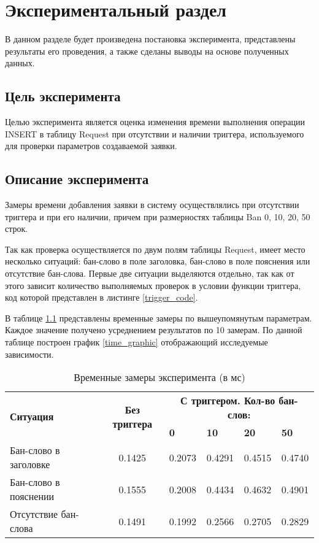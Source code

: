 \chapter{Экспериментальный раздел}

В данном разделе будет произведена постановка эксперимента, представлены результаты его проведения, а также сделаны выводы на основе полученных данных.

\section{Цель эксперимента}

Целью эксперимента является оценка изменения времени выполнения операции INSERT в таблицу Request при отсутствии и наличии триггера, используемого для проверки параметров создаваемой заявки.

\section{Описание эксперимента}

Замеры времени добавления заявки в систему осуществлялись при отсутствии триггера и при его наличии, причем при размерностях таблицы Ban 0, 10, 20, 50 строк.

Так как проверка осуществляется по двум полям таблицы Request, имеет место несколько ситуаций: бан-слово в поле заголовка, бан-слово в поле пояснения или отсутствие бан-слова. Первые две ситуации выделяются отдельно, так как от этого зависит количество выполняемых проверок в условии функции триггера, код которой представлен в листинге \ref{trigger_code}.
\newpage

В таблице \ref{time_measurements} представлены временные замеры по вышеупомянутым параметрам. Каждое значение получено усреднением результатов по 10 замерам. По данной таблице построен график \ref{time_graphic} отображающий исследуемые зависимости.

\begin{table}[H]
	\centering
	\caption{Временные замеры эксперимента (в мс)}
	\label{time_measurements}
	\begin{tabular}{|p{2.6cm}|c|p{1.6cm}|p{1.6cm}|p{1.6cm}|p{1.6cm}|}
		\hline
		\multirow{2}{*}{\textbf{Ситуация}} & \multirow{2}{*}{\textbf{Без триггера}} & \multicolumn{4}{c|}{\textbf{С триггером. Кол-во бан-слов:}}\\
		\cline{3-6}
		& & \textbf{0} & \textbf{10} & \textbf{20} & \textbf{50}\\
		\hline
		Бан-слово в заголовке & 0.1425 & 0.2073 & 0.4291 & 0.4515 & 0.4740 \\
		\hline
		Бан-слово в пояснении & 0.1555 & 0.2008 & 0.4434 & 0.4632 & 0.4901 \\
		\hline
		Отсутствие бан-слова & 0.1491 & 0.1992 & 0.2566 & 0.2705 & 0.2829 \\
		\hline
	\end{tabular}
\end{table}

